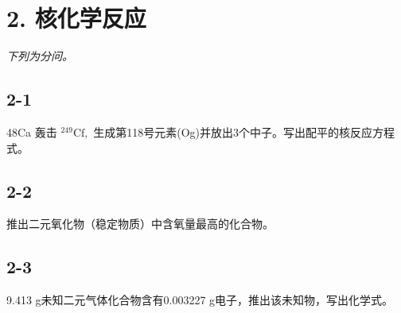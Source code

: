 \section*{2. 核化学反应}
\textit{下列为分问。}

\subsection*{2-1}
48Ca 轰击 $^ { 2 4 9 } \mathrm { C f } ,$ ⽣成第118号元素(Og)并放出3个中⼦。写出配平的核反应⽅程式。

\subsection*{2-2}
推出⼆元氧化物（稳定物质）中含氧量最⾼的化合物。

\subsection*{2-3}
9.413 g未知⼆元⽓体化合物含有0.003227 g电⼦，推出该未知物，写出化学式。
